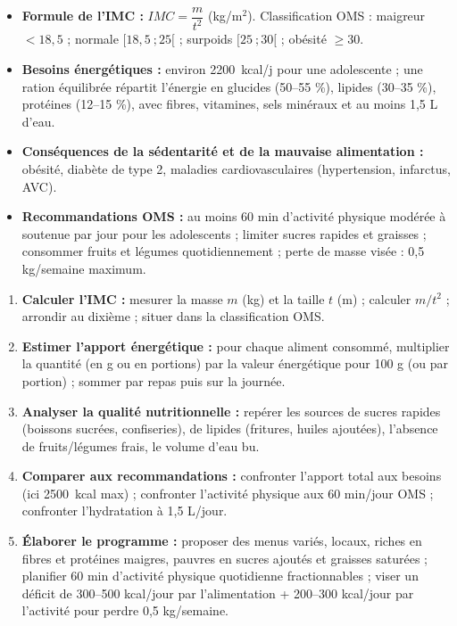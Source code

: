\documentclass[11pt]{article}
\newcounter{popsec}
\newcounter{popsub}
\newcommand{\courssub}[1]{%
  \stepcounter{popsub}%
  \par\vspace{9pt}\noindent{\popxbold\fontsize{11.5}{13}\selectfont\color{popink}{\color{poporange}\thepopsec.\thepopsub}\hspace{6pt}#1}\par\nopagebreak\vspace{4pt}
}
\begin{document}
\courssub{Ressources à mobiliser}

\begin{aretenir}
\begin{itemize}
\item \textbf{Formule de l'IMC :} $IMC = \dfrac{m}{t^2}$ (kg/m$^2$). Classification OMS : maigreur $< 18,5$ ; normale $[18,5\ ; 25[$ ; surpoids $[25\ ; 30[$ ; obésité $\geq 30$.
\item \textbf{Besoins énergétiques :} environ \SI{2200}{kcal/j} pour une adolescente ; une ration équilibrée répartit l'énergie en glucides (50--55 \%), lipides (30--35 \%), protéines (12--15 \%), avec fibres, vitamines, sels minéraux et au moins 1,5 L d'eau.
\item \textbf{Conséquences de la sédentarité et de la mauvaise alimentation :} obésité, diabète de type 2, maladies cardiovasculaires (hypertension, infarctus, AVC).
\item \textbf{Recommandations OMS :} au moins 60 min d'activité physique modérée à soutenue par jour pour les adolescents ; limiter sucres rapides et graisses ; consommer fruits et légumes quotidiennement ; perte de masse visée : 0,5 kg/semaine maximum.
\end{itemize}
\end{aretenir}

\begin{methode}
\begin{enumerate}
\item \textbf{Calculer l'IMC :} mesurer la masse $m$ (kg) et la taille $t$ (m) ; calculer $m/t^2$ ; arrondir au dixième ; situer dans la classification OMS.
\item \textbf{Estimer l'apport énergétique :} pour chaque aliment consommé, multiplier la quantité (en g ou en portions) par la valeur énergétique pour 100 g (ou par portion) ; sommer par repas puis sur la journée.
\item \textbf{Analyser la qualité nutritionnelle :} repérer les sources de sucres rapides (boissons sucrées, confiseries), de lipides (fritures, huiles ajoutées), l'absence de fruits/légumes frais, le volume d'eau bu.
\item \textbf{Comparer aux recommandations :} confronter l'apport total aux besoins (ici \SI{2500}{kcal} max) ; confronter l'activité physique aux 60 min/jour OMS ; confronter l'hydratation à 1,5 L/jour.
\item \textbf{Élaborer le programme :} proposer des menus variés, locaux, riches en fibres et protéines maigres, pauvres en sucres ajoutés et graisses saturées ; planifier 60 min d'activité physique quotidienne fractionnables ; viser un déficit de 300--500 kcal/jour par l'alimentation + 200--300 kcal/jour par l'activité pour perdre 0,5 kg/semaine.
\end{enumerate}
\end{methode}
\end{document}
